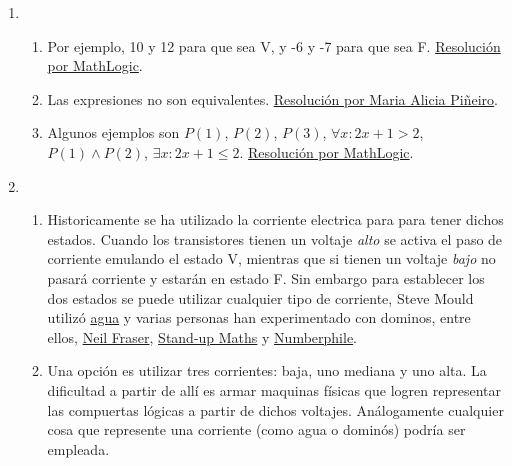 \documentclass[a4paper]{article}
\newcommand{\exercise}{\item}
\begin{document}
\begin{enumerate}
\begin{enumerate} [label=(\alph*)]
		\item Razonamiento válido. \href{https://youtu.be/0Dcg9nDzkys?t=1194}{Resolución por Maria Alicia Piñeiro}.
		\item Razonamiento válido. \href{https://youtu.be/AMDgepP_N_A}{Resolución por Jonathan Castro}.
		\item Razonamiento inválido. Se puede demostrar por contraejemplo, definiendo un universo de sillones a elección. \href{https://youtu.be/kszEIGQ1XOA}{Resolución por Maria Alicia Piñeiro}.
		\item Razonamiento válido. Se puede demostrar por contraejemplo, definiendo un universo de sillones a elección. \href{https://youtu.be/kszEIGQ1XOA?t=285}{Resolución por Maria Alicia Piñeiro}.
		\item Razonamiento válido. \href{https://youtu.be/6QGZCc6QbVE}{Resolución por Maria Alicia Piñeiro} y su \href{https://youtu.be/C-BJgBFUIPA}{continuación}.
\end{enumerate}\exercise\begin{enumerate} [label=(\alph*)]		\item Por ejemplo, 10 y 12 para que sea V, y -6 y -7 para que sea F. \href{https://youtu.be/DLsV_L097gE?t=687}{Resolución por MathLogic}.
		\item Las expresiones no son equivalentes. \href{https://youtu.be/WC7P8FMIHFw}{Resolución por Maria Alicia Piñeiro}.
		\item Algunos ejemplos son $P(1)$, $P(2)$, $P(3)$, $\forall x: 2x+1>2$, $P(1) \land P(2)$, $\exists x: 2x+1 \leq 2$. \href{https://youtu.be/rnaCiSpVtP4?t=633}{Resolución por MathLogic}.
\end{enumerate}\exercise\begin{enumerate} [label=(\alph*)]		\item Historicamente se ha utilizado la corriente electrica para para tener dichos estados. Cuando los transistores tienen un voltaje \textit{alto} se activa el paso de corriente emulando el estado V, mientras que si tienen un voltaje \textit{bajo} no pasará corriente y estarán en estado F. Sin embargo para establecer los dos estados se puede utilizar cualquier tipo de corriente, Steve Mould utilizó \href{https://youtu.be/IxXaizglscw}{agua} y varias personas han experimentado con dominos, entre ellos, \href{https://youtu.be/SudixyugiX4}{Neil Fraser}, \href{https://youtu.be/OpLU__bhu2w}{Stand-up Maths} y \href{https://youtu.be/lNuPy-r1GuQ}{Numberphile}.  
		\item Una opción es utilizar tres corrientes: baja, uno mediana y uno alta. La dificultad a partir de allí es armar maquinas físicas que logren representar las compuertas lógicas a partir de dichos voltajes. Análogamente cualquier cosa que represente una corriente (como agua o dominós) podría ser empleada. 

\end{enumerate}
\end{enumerate}
\end{document}
